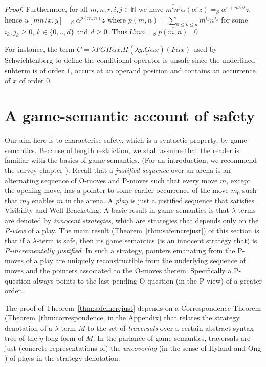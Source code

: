 \documentclass{llncs}
\newcommand{\encode}[1]{\overline{#1}} \newcommand\dps{\displaystyle}
\newcommand\nat{\mathbb{N}}
\begin{document}
\begin{proof}
Furthermore, for all $m,n,r,i,j\in \nat$
we have $\encode{m^i n^j} \alpha (\alpha^r z) =_\beta
\alpha^{r + m^i n^j} z$,
hence $u[\encode{m} \encode{n}/x,y] =_\beta \alpha^{p(m,n)} z$ where $p(m,n) = \sum_{0\leq k \leq d} m^{i_k} n^{j_k}$ for some $i_k,j_k \geq 0$, $k \in\{ 0,..,d \}$ and $d\geq 0$.
Thus $U \encode{m} \encode{n} =_\beta \encode{p(m,n)}$. \qed
\end{proof}

For instance, the term $ C = \lambda F G H \alpha x . H (
\underline{\lambda y . G \alpha x} ) (F \alpha x)$ used by
Schwichtenberg \cite{citeulike:622637} to define the conditional
operator is unsafe since the underlined subterm is of order $1$,
occurs at an operand position and contains an occurrence of $x$ of
order $0$.


\section{A game-semantic account of safety}
\label{sec:gamesemaccount}
Our aim here is to characterise safety, which is a syntactic property,
by game semantics. Because of length restriction, we shall assume that
the reader is familiar with the basics of game semantics.  (For an
introduction, we recommend the survey chapter
\cite{ghicamccusker00}). Recall that a \emph{justified sequence} over
an arena is an alternating sequence of O-moves and P-moves such that
every move $m$, except the opening move, has a pointer to some earlier
occurrence of the move $m_0$ such that $m_0$ enables $m$ in the
arena. A \emph{play} is just a justified sequence that satisfies
Visibility and Well-Bracketing. A basic result in game semantics is
that $\lambda$-terms are denoted by \emph{innocent strategies}, which
are strategies that depends only on the \emph{P-view} of a play. The
main result (Theorem~\ref{thm:safeincrejust}) of this section is that
if a $\lambda$-term is safe, then its game semantics (is an innocent
strategy that) is \emph{P-incrementally justified}. In such a
strategy, pointers emanating from the P-moves of a play are uniquely
reconstructible from the underlying sequence of moves and the pointers
associated to the O-moves therein: Specifically a P-question always
points to the last pending O-question (in the P-view) of a greater
order.

The proof of Theorem~\ref{thm:safeincrejust} depends on a
Correspondence Theorem (Theorem~\ref{thm:correspondence} in the
Appendix) that relates the strategy denotation of a $\lambda$-term $M$
to the set of \emph{traversals} over a certain abstract syntax tree of
the $\eta$-long form of $M$. In the parlance of game semantics,
traversals are just (concrete representations of) the
\emph{uncovering} (in the sense of Hyland and Ong
\cite{hylandong_pcf}) of plays in the strategy denotation.
\end{document}
